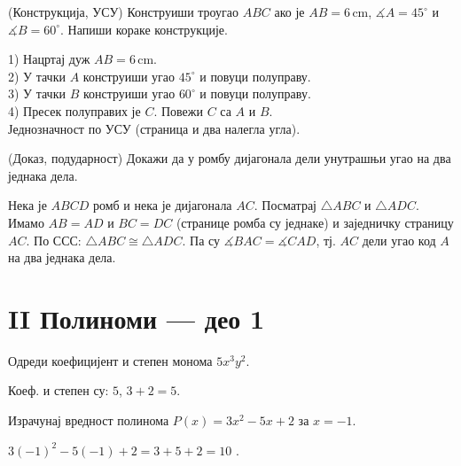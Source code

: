 \documentclass[10pt,a5paper,addpoints]{exam}
\newcommand{\measure}[2]{#1\,\mathrm{#2}}
\def\variant#1#2#3{#1}
\begin{document}
\begin{questions}
\ifprintanswers\else\newpage\fi

\question[4]
(Конструкција, УСУ) Конструиши троугао $ABC$ ако је
$AB=\measure{\variant{6}{5}{7}}{cm}$,
$\measuredangle A=\variant{45^\circ}{30^\circ}{60^\circ}$ и
$\measuredangle B=\variant{60^\circ}{75^\circ}{45^\circ}$.
Напиши кораке конструкције.
\begin{solution}[\stretch 3]
1) Нацртај дуж $AB=\measure{\variant{6}{5}{7}}{cm}$. \\
2) У тачки $A$ конструиши угао $\variant{45^\circ}{30^\circ}{60^\circ}$ и повуци полуправу. \\
3) У тачки $B$ конструиши угао $\variant{60^\circ}{75^\circ}{45^\circ}$ и повуци полуправу. \\
4) Пресек полуправих је $C$. Повежи $C$ са $A$ и $B$. \\
Једнозначност по УСУ (страница и два налегла угла).
\end{solution}

\question[4]
(Доказ, подударност) Докажи да у ромбу дијагонала дели унутрашњи угао на два једнака дела.
\begin{solution}[\stretch 3]
Нека је $ABCD$ ромб и нека је дијагонала $AC$.
Посматрај $\triangle ABC$ и $\triangle ADC$.
Имамо $AB=AD$ и $BC=DC$ (странице ромба су једнаке) и заједничку страницу $AC$.
По ССС: $\triangle ABC \cong \triangle ADC$.
Па су $\measuredangle BAC=\measuredangle CAD$, тј. $AC$ дели угао код $A$ на два једнака дела.
\end{solution}

\section*{II Полиноми — део 1}

\question[2]
Одреди коефицијент и степен монома
$\variant{5x^3y^2}{-4a^2b}{\tfrac{1}{3}c}$.
\begin{solution}[\stretch 2]
Коеф. и степен су:
\variant{$5$, $3+2=5$}{\(-4\), \(2+1=3\)}{\(\tfrac{1}{3}\), \(1\)}.
\end{solution}

\question[2]
Израчунај вредност полинома
$P(x)=\variant{3x^2-5x+2}{-2x^3+4x-1}{2x^2-3x+1}$
за $x=\variant{-1}{2}{-1}$.
\begin{solution}[\stretch 2]
\variant{
$3(-1)^2-5(-1)+2=3+5+2=10$
}{
$-2\cdot 2^3+4\cdot 2-1=-16+8-1=-9$
}{
$2(-1)^2-3(-1)+1=2+3+1=6$
}.
\end{solution}


\end{questions}
\end{document}
